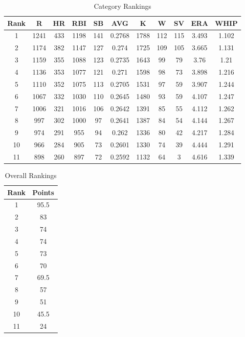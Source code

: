 \documentclass{article}
\begin{document}
\begin{table}[ht] \caption{Category Rankings}
\centering
\begin{tabular}{c c c c c c c c c c c} 
\hline\hline 
Rank & R & HR & RBI & SB & AVG & K & W & SV & ERA & WHIP \\
\hline
1 & 1241 & 433 & 1198 & 141 & 0.2768 & 1788 & 112 & 115 & 3.493 & 1.102 \\
2 & 1174 & 382 & 1147 & 127 & 0.274 & 1725 & 109 & 105 & 3.665 & 1.131 \\
3 & 1159 & 355 & 1088 & 123 & 0.2735 & 1643 & 99 & 79 & 3.76 & 1.21 \\
4 & 1136 & 353 & 1077 & 121 & 0.271 & 1598 & 98 & 73 & 3.898 & 1.216 \\
5 & 1110 & 352 & 1075 & 113 & 0.2705 & 1531 & 97 & 59 & 3.907 & 1.244 \\
6 & 1067 & 332 & 1030 & 110 & 0.2645 & 1480 & 93 & 59 & 4.107 & 1.247 \\
7 & 1006 & 321 & 1016 & 106 & 0.2642 & 1391 & 85 & 55 & 4.112 & 1.262 \\
8 & 997 & 302 & 1000 & 97 & 0.2641 & 1387 & 84 & 54 & 4.144 & 1.267 \\
9 & 974 & 291 & 955 & 94 & 0.262 & 1336 & 80 & 42 & 4.217 & 1.284 \\
10 & 966 & 284 & 905 & 73 & 0.2601 & 1330 & 74 & 39 & 4.444 & 1.291 \\
11 & 898 & 260 & 897 & 72 & 0.2592 & 1132 & 64 & 3 & 4.616 & 1.339 \\ [1ex] 
\hline
\end{tabular}
\end{table}

\begin{table}[ht] \caption{Overall Rankings}
\centering
\begin{tabular}{c c}
\hline\hline
Rank & Points \\
\hline 
1 & 95.5 \\
2 & 83 \\
3 & 74 \\
4 & 74 \\
5 & 73 \\
6 & 70 \\
7 & 69.5 \\
8 & 57 \\
9 & 51 \\
10 & 45.5 \\
11 & 24 \\
[1ex] 
\hline
\end{tabular}
\end{table}
\end{document}
